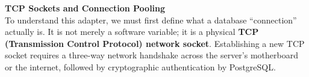 


\textbf{TCP Sockets and Connection Pooling} \\
To understand this adapter, we must first define what a database ``connection'' actually is. It is not merely a software variable; it is a physical \textbf{TCP (Transmission Control Protocol) network socket}. Establishing a new TCP socket requires a three-way network handshake across the server's motherboard or the internet, followed by cryptographic authentication by PostgreSQL.


